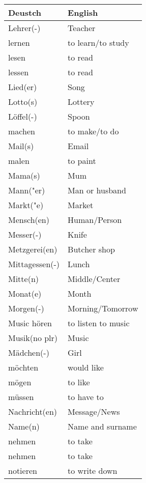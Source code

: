 \documentclass{article}
\renewcommand{\arraystretch}{1}
\begin{document}
\newpage

\begin{minipage}{0.48\textwidth}
    \centering
    \renewcommand{\arraystretch}{1.5}
    \begin{tabular}{|>{\raggedright\arraybackslash}p{3.5cm}|>{\raggedright\arraybackslash}p{3.5cm}|}
        \hline
        \rowcolor{gray!20} \textbf{Deustch} & \textbf{English} \\
        \hline
        Lehrer(-) & Teacher \\\hline
        lernen & to learn/to study \\\hline
        lesen & to read \\\hline
        lessen & to read \\\hline
        Lied(er) & Song \\\hline
        Lotto(s) & Lottery \\\hline
        Löffel(-) & Spoon \\\hline
        machen & to make/to do \\\hline
        Mail(s) & Email \\\hline
        malen & to paint \\\hline
        Mama(s) & Mum \\\hline
        Mann("er) & Man or husband \\\hline
        Markt("e) & Market \\\hline
        Mensch(en) & Human/Person \\\hline
        Messer(-) & Knife \\\hline
        Metzgerei(en) & Butcher shop \\\hline
        Mittagessen(-) & Lunch \\\hline
        Mitte(n) & Middle/Center \\\hline
        Monat(e) & Month \\\hline
        Morgen(-) & Morning/Tomorrow \\\hline
        Music hören & to listen to music \\\hline
        Musik(no plr) & Music \\\hline
        Mädchen(-) & Girl \\\hline
        möchten & would like \\\hline
        mögen & to like \\\hline
        müssen & to have to \\\hline
        Nachricht(en) & Message/News \\\hline
        Name(n) & Name and surname \\\hline
        nehmen &  to take \\\hline
        nehmen & to take \\\hline
        notieren & to write down \\\hline
    \end{tabular}
\end{minipage}%
\end{document}
